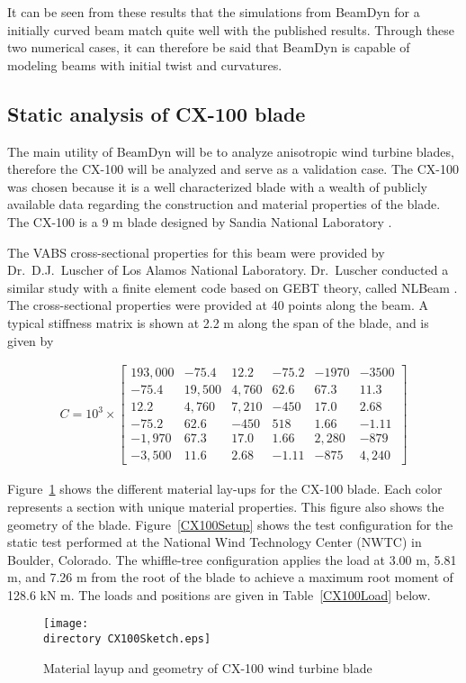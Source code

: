 \documentclass{aiaa-tc}
\def\directory{EPSF/}
\begin{document}
It can be seen from these results that the simulations from BeamDyn for a initially curved beam match quite well with the published results. Through these two numerical cases, it can therefore be said that BeamDyn is capable of modeling beams with initial twist and curvatures.

\subsection{Static analysis of CX-100 blade}
The main utility of BeamDyn will be to analyze anisotropic wind turbine blades, therefore the CX-100 will be analyzed and serve as a validation case. The CX-100 was chosen because it is a well characterized blade with a wealth of publicly available data regarding the construction and material properties of the blade. The CX-100 is a 9 m blade designed by Sandia National Laboratory \cite{paquette2006modeling}.

The VABS cross-sectional properties for this beam were provided by Dr.\ D.J.\ Luscher of Los Alamos National Laboratory. Dr.\ Luscher conducted a similar study with a finite element code based on GEBT theory, called NLBeam \cite{Luscher:2013}. The cross-sectional properties were provided at 40 points along the beam. A typical stiffness matrix is shown at 2.2 m along the span of the blade, and is given by

\begin{align*}
C =10^3 \times \begin{bmatrix}
	193,000 & -75.4   & 12.2   & -75.2  & -1970    & -3500    \\
	-75.4  & 19,500 & 4,760   & 62.6  & 67.3    & 11.3    \\
	12.2  & 4,760   & 7,210 & -450  & 17.0    & 2.68    \\
	-75.2  & 62.6   & -450   & 518 & 1.66    & -1.11    \\
	-1,970  & 67.3   & 17.0   & 1.66  & 2,280 & -879    \\
	-3,500  & 11.6   & 2.68   & -1.11  & -875    & 4,240
\end{bmatrix}
\end{align*}


Figure~\ref{CX100Sketch} \cite{paquette2006modeling} shows the different material lay-ups for the CX-100 blade. Each color represents a section with unique material properties. This figure also shows the geometry of the blade. Figure~\ref{CX100Setup} \cite{paquette2006modeling} shows the test configuration for the static test performed at the National Wind Technology Center (NWTC) in Boulder, Colorado. The whiffle-tree configuration applies the load at 3.00 m, 5.81 m, and 7.26 m from the root of the blade to achieve a maximum root moment of 128.6 kN m. The loads and positions are given in Table~\ref{CX100Load} below.
\begin{figure}
\centering
\texttt{[image: \\directory CX100Sketch.eps]}
\caption{Material layup and geometry of CX-100 wind turbine blade} 
\label{CX100Sketch}
\end{figure}
\end{document}
